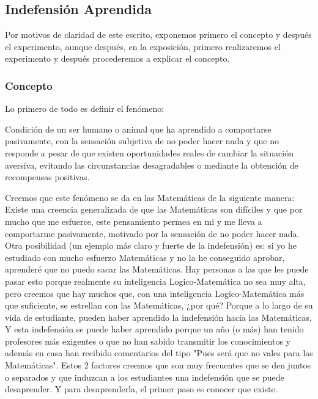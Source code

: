 \subsection{Indefensión Aprendida}
\label{defn::indefension}

Por motivos de claridad de este escrito, exponemos primero el concepto y después el experimento, aunque después, en la exposición, primero realizaremos el experimento y después procederemos a explicar el concepto.

\subsubsection{Concepto}

Lo primero de todo es definir el fenómeno:
\begin{defn}
Condición de un ser humano o animal que ha aprendido a comportarse pasivamente, con la sensación subjetiva de no poder hacer nada y que no responde a pesar de que existen oportunidades reales de cambiar la situación aversiva, evitando las circunstancias desagradables o mediante la obtención de recompensas positivas.
\end{defn}

Creemos que este fenómeno se da en las Matemáticas de la siguiente manera:
%
Existe una creencia generalizada de que las Matemáticas son difíciles y que por mucho que me esfuerce, este pensamiento permea en mi y me lleva a comportarme pasivamente, motivado por la sensación de no poder hacer nada.
%
Otra posibilidad (un ejemplo más claro y fuerte de la indefensión) es: si yo he estudiado con mucho esfuerzo Matemáticas y no la he conseguido aprobar, aprenderé que no puedo sacar las Matemáticas.
%
Hay personas a las que les puede pasar esto porque realmente su inteligencia Logico-Matemática no sea muy alta, pero creemos que hay muchos que, con una inteligencia Logico-Matemática más que suficiente, se estrellan con las Matemáticas, ¿por qué? 
%
Porque a lo largo de su vida de estudiante, pueden haber aprendido la indefensión hacia las Matemáticas. 
%
Y esta indefensión se puede haber aprendido porque un año (o más) han tenido profesores más exigentes o que no han sabido transmitir los conocimientos y además en casa han recibido comentarios del tipo "Pues será que no vales para las Matemáticas".
%
Estos 2 factores creemos que son muy frecuentes que se den juntos o separados y que induzcan a los estudiantes una indefensión que se puede desaprender. Y para desaprenderla, el primer paso es conocer que existe.

